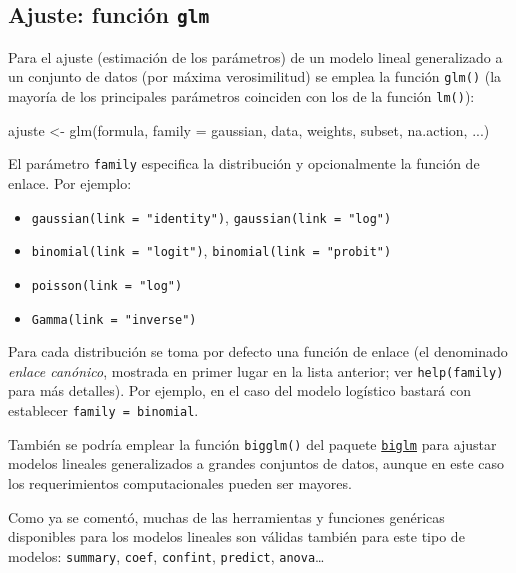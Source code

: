 \documentclass[
]{book}
\newenvironment{Shaded}{\begin{snugshade}}{\end{snugshade}}
\newcommand{\AttributeTok}[1]{\textcolor[rgb]{0.77,0.63,0.00}{#1}}
\newcommand{\FunctionTok}[1]{\textcolor[rgb]{0.00,0.00,0.00}{#1}}
\newcommand{\NormalTok}[1]{#1}
\newcommand{\OtherTok}[1]{\textcolor[rgb]{0.56,0.35,0.01}{#1}}
\theoremstyle{break}
\theoremstyle{definition}
\theoremstyle{definition}
\theoremstyle{definition}
\theoremstyle{definition}
\theoremstyle{remark}
\begin{document}
\hypertarget{ajuste-funciuxf3n-glm}{%
\subsection{\texorpdfstring{Ajuste: función \texttt{glm}}{Ajuste: función glm}}\label{ajuste-funciuxf3n-glm}}

Para el ajuste (estimación de los parámetros) de un modelo lineal generalizado a un conjunto de datos (por máxima verosimilitud) se emplea la función \texttt{glm()} (la mayoría de los principales parámetros coinciden con los de la función \texttt{lm()}):

\begin{Shaded}
\begin{Highlighting}[]
\NormalTok{ajuste }\OtherTok{\textless{}{-}} \FunctionTok{glm}\NormalTok{(formula, }\AttributeTok{family =}\NormalTok{ gaussian, data, weights, subset, na.action, ...)}
\end{Highlighting}
\end{Shaded}

El parámetro \texttt{family} especifica la distribución y opcionalmente la función de enlace.
Por ejemplo:

\begin{itemize}
\item
  \texttt{gaussian(link\ =\ "identity")}, \texttt{gaussian(link\ =\ "log")}
\item
  \texttt{binomial(link\ =\ "logit")}, \texttt{binomial(link\ =\ "probit")}
\item
  \texttt{poisson(link\ =\ "log")}
\item
  \texttt{Gamma(link\ =\ "inverse")}
\end{itemize}

Para cada distribución se toma por defecto una función de enlace (el denominado \emph{enlace canónico}, mostrada en primer lugar en la lista anterior; ver \texttt{help(family)} para más detalles).
Por ejemplo, en el caso del modelo logístico bastará con establecer \texttt{family\ =\ binomial}.

También se podría emplear la función \texttt{bigglm()} del paquete \href{https://CRAN.R-project.org/package=biglm}{\texttt{biglm}} para ajustar modelos lineales generalizados a grandes conjuntos de datos, aunque en este caso los requerimientos computacionales pueden ser mayores.

Como ya se comentó, muchas de las herramientas y funciones genéricas disponibles para los modelos lineales son válidas también para este tipo de modelos: \texttt{summary}, \texttt{coef}, \texttt{confint}, \texttt{predict}, \texttt{anova}\ldots{}
\end{document}
